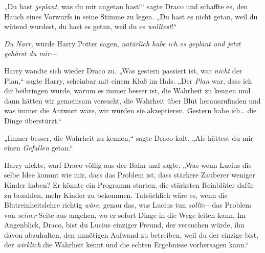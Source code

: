 „Du hast \emph{geplant}, was du mir angetan hast!“ sagte Draco und schaffte es, den Hauch eines Vorwurfs in seine Stimme zu legen. „Du hast es nicht getan, weil du wütend wurdest, du hast es getan, weil du es \emph{wolltest}!“

\emph{Du Narr,} würde Harry Potter sagen, \emph{natürlich habe ich es geplant und jetzt gehörst du mir—}

Harry wandte sich wieder Draco zu. „Was gestern passiert ist, war \emph{nicht} der Plan,“ sagte Harry, scheinbar mit einem Kloß im Hals. „Der \emph{Plan} war, dass ich dir beibringen würde, warum es immer besser ist, die Wahrheit zu kennen und dann hätten wir gemeinsam versucht, die Wahrheit über Blut herauszufinden und was immer die Antwort wäre, wir würden sie akzeptieren. Gestern habe ich… die Dinge überstürzt.“

„Immer besser, die Wahrheit zu kennen,“ sagte Draco kalt. „Als hättest du mir einen \emph{Gefallen} getan.“

Harry nickte, warf Draco völlig aus der Bahn und sagte, „Was wenn Lucius die selbe Idee kommt wie mir, dass das Problem ist, dass stärkere Zauberer weniger Kinder haben? Er könnte ein Programm starten, die stärksten Reinblüter dafür zu bezahlen, mehr Kinder zu bekommen. Tatsächlich wäre es, wenn die Blutreinheitslehre richtig \emph{wäre}, genau das, was Lucius tun \emph{sollte}—das Problem von \emph{seiner} Seite aus angehen, wo er sofort Dinge in die Wege leiten kann. Im Augenblick, Draco, bist du Lucius einziger Freund, der versuchen würde, ihn davon abzuhalten, den unnötigen Aufwand zu betreiben, weil du der einzige bist, der \emph{wirklich} die Wahrheit kennt und die echten Ergebnisse vorhersagen kann.“

